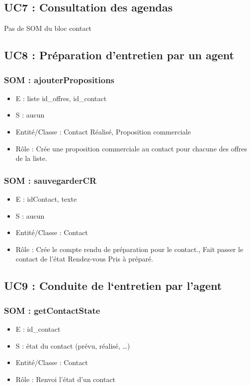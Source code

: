 \subsection{UC7 : Consultation des agendas}
Pas de SOM du bloc contact



\subsection{UC8 : Préparation d’entretien par un agent}
\subsubsection{SOM : ajouterPropositions}
	\begin{itemize}
		\item E : liste id\_offres, id\_contact
		\item S : aucun
		\item Entité/Classe : Contact Réalisé, Proposition commerciale
		\item Rôle : Crée une proposition commerciale au contact pour chacune des offres de la
	liste.
	\end{itemize}

\subsubsection{SOM : sauvegarderCR}
	\begin{itemize}
		\item E : idContact, texte
		\item S : aucun
		\item Entité/Classe : Contact
		\item Rôle : Crée le compte rendu de préparation pour le contact., Fait passer le contact
	de l’état Rendez-vous Pris à préparé.
	\end{itemize}



\subsection{UC9 : Conduite de l‘entretien par l’agent}
\subsubsection{SOM : getContactState}
	\begin{itemize}
		\item E : id\_contact
		\item S : état du contact (prévu, réalisé, …)
		\item Entité/Classe : Contact
		\item Rôle : Renvoi l’état d’un contact
	\end{itemize}

